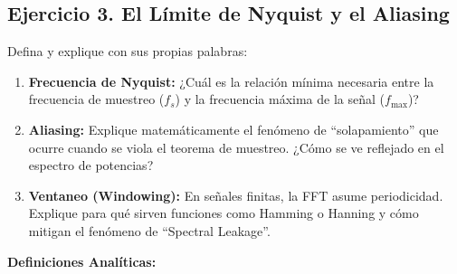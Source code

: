 \subsection*{Ejercicio 3. El Límite de Nyquist y el Aliasing}

Defina y explique con sus propias palabras:

\begin{enumerate}
    \item \textbf{Frecuencia de Nyquist:} ¿Cuál es la relación mínima necesaria entre la frecuencia de muestreo ($f_s$) y la frecuencia máxima de la señal ($f_{\text{max}}$)?
    \item \textbf{Aliasing:} Explique matemáticamente el fenómeno de ``solapamiento'' que ocurre cuando se viola el teorema de muestreo. ¿Cómo se ve reflejado en el espectro de potencias?
    \item \textbf{Ventaneo (Windowing):} En señales finitas, la FFT asume periodicidad. Explique para qué sirven funciones como Hamming o Hanning y cómo mitigan el fenómeno de ``Spectral Leakage''.
\end{enumerate}

\vspace{0.5cm}

\textbf{Definiciones Analíticas:}

